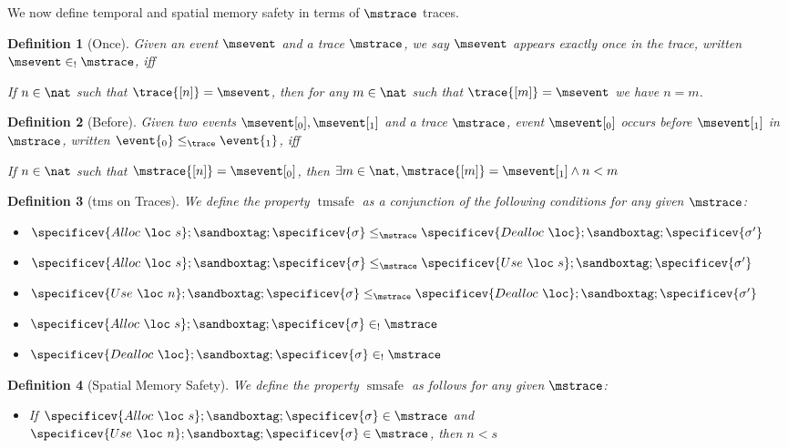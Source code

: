 \documentclass[a4paper,names,dvipsnames]{article}
\newtheorem{definition}{Definition}
\begin{document}
We now define temporal and spatial memory safety in terms of $\mstrace$ traces.

\begin{definition}[Once]
  Given an event $\msevent$ and a trace $\mstrace$, we say $\msevent$ appears exactly once in the trace, written $\msevent\in_{!}\mstrace$, iff

  If $n\in\nat$ such that $\trace{[n]}=\msevent$, then for any $m\in\nat$ such that $\trace{[m]}=\msevent$ we have $n = m$.
\end{definition}

\begin{definition}[Before]
  Given two events $\msevent[_0],\msevent[_1]$ and a trace $\mstrace$, event $\msevent[_0]$ occurs before $\msevent[_1]$ in $\mstrace$, written
  $\event{_0}\le_{\trace}\event{_1}$, iff

  If $n\in\nat$ such that $\mstrace{[n]} = \msevent[_{0}]$, then $\exists m\in\nat, \mstrace{[m]} = \msevent[_1] \wedge n< m$
\end{definition}

\begin{definition}[\gls{tms} on Traces]\label{def:tempmemsafe}
  We define the property $\operatorname{tmsafe}$ as a conjunction of the following conditions for any given $\mstrace$:
  \begin{itemize}
    \item $\specificev{Alloc\ \loc\ s};\sandboxtag;\specificev{\sigma}\le_{{\mstrace}}\specificev{Dealloc\ \loc};\sandboxtag;\specificev{\sigma'}$
    \item $\specificev{Alloc\ \loc\ s};\sandboxtag;\specificev{\sigma}\le_{{\mstrace}}\specificev{Use\ \loc\ s};\sandboxtag;\specificev{\sigma'}$
    \item $\specificev{Use\ \loc\ n};\sandboxtag;\specificev{\sigma}\le_{{\mstrace}}\specificev{Dealloc\ \loc};\sandboxtag;\specificev{\sigma'}$
    \item $\specificev{Alloc\ \loc\ s};\sandboxtag;\specificev{\sigma}\in_{!}\mstrace$
    \item $\specificev{Dealloc\ \loc};\sandboxtag;\specificev{\sigma}\in_{!}\mstrace$
  \end{itemize}
\end{definition}

\begin{definition}[Spatial Memory Safety]\label{def:spatmemsafe}
  We define the property $\operatorname{smsafe}$ as follows for any given $\mstrace$:
  \begin{itemize}
    \item If $\specificev{Alloc\ \loc\ s};\sandboxtag;\specificev{\sigma}\in{\mstrace}$ and $\specificev{Use\ \loc\ n};\sandboxtag;\specificev{\sigma}\in{\mstrace}$, then ${n}<{s}$
  \end{itemize}
\end{definition}
\end{document}

